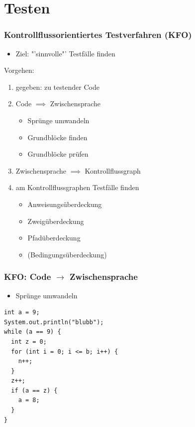 \documentclass[18pt]{beamer}
\begin{document}
\section{Testen}

	\begin{frame}
		\frametitle{Kontrollflussorientiertes Testverfahren (KFO)}
		\begin{itemize}
			\item Ziel: "'sinnvolle"' Testfälle finden
		\end{itemize}
		Vorgehen:
		\begin{enumerate}
			\item gegeben: zu testender Code \pause
			\item Code $\implies$ Zwischensprache
			\begin{itemize}
				\item Sprünge umwandeln
				\item Grundblöcke finden
				\item Grundblöcke prüfen
			\end{itemize}
			\pause
			\item Zwischensprache $\implies$ Kontrollflussgraph \pause
			\item am Kontrollflussgraphen Testfälle finden \pause
			\begin{itemize}
				\item Anweisungsüberdeckung
				\item Zweigüberdeckung 
				\item Pfadüberdeckung
				\item (Bedingungsüberdeckung)
			\end{itemize}
		\end{enumerate}
	\end{frame}

	\begin{frame}[fragile]
		\frametitle{KFO: Code $\rightarrow$ Zwischensprache}
		\begin{itemize}
			\item Sprünge umwandeln
		\end{itemize}
	\centering
			\begin{verbatim}
int a = 9;
System.out.println("blubb");
while (a == 9) {
  int z = 0;
  for (int i = 0; i <= b; i++) {
    n++;
  }
  z++;
  if (a == z) {
    a = 8;
  }
}
			\end{verbatim}
	\end{frame}
\end{document}
